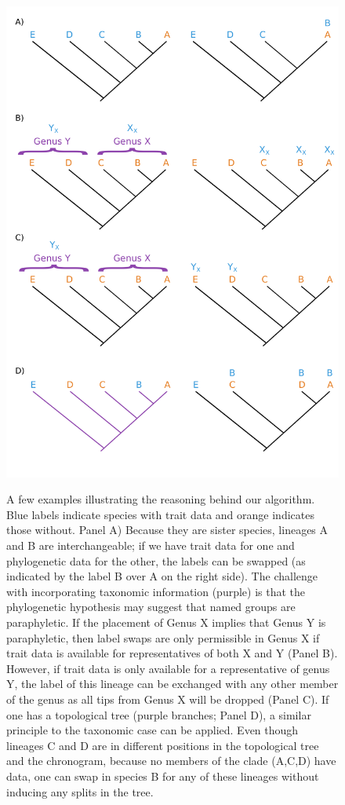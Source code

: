 \documentclass[a4paper,11pt]{article}
\begin{document}
\begin{figure}[p]
\includegraphics[scale=0.7]{figs/algo-description}
\caption{}
\label{fig:algo}
\end{figure}

\addtocounter{figure}{-1}
\begin{figure} [p]
  \caption{A few examples illustrating the reasoning behind our algorithm. Blue labels indicate species with trait data and orange indicates those without. Panel A) Because they are sister species, lineages A and B are interchangeable; if we have trait data for one and phylogenetic data for the other, the labels can be swapped (as indicated by the label B over A on the right side). The challenge with incorporating taxonomic information (purple) is that the phylogenetic hypothesis may suggest that named groups are paraphyletic. If the placement of Genus X implies that Genus Y is paraphyletic, then label swaps are only permissible in Genus X if trait data is available for representatives of both X and Y (Panel B). However, if trait data is only available for a representative of genus Y, the label of this lineage can be exchanged with any other member of the genus as all tips from Genus X will be dropped (Panel C). If one has a topological tree (purple branches; Panel D), a similar principle to the taxonomic case can be applied. Even though lineages C and D are in different positions in the topological tree and the chronogram, because no members of the clade (A,C,D) have data, one can swap in species B for any of these lineages without inducing any splits in the tree.}
\end{figure}
\end{document}
